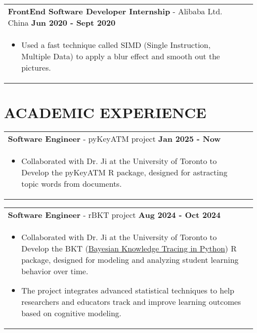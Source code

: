 \documentclass[a4paper,12pt]{article}
\begin{document}
\begin{tabularx}{\linewidth}{ @{}l r@{} }
\textbf{FrontEnd Software Developer Internship} - Alibaba Ltd. China \hfill \textbf{Jun 2020 - Sept 2020} \\[4pt]
\begin{minipage}[t]{\linewidth}
    \begin{itemize}[nosep,after=\strut, leftmargin=1em, itemsep=2pt]
        \item Used a fast technique called SIMD (Single Instruction, Multiple Data) to apply a blur effect and smooth out the pictures.
    \end{itemize}
\end{minipage}
\end{tabularx}

\hfill
\section{\textbf{ACADEMIC EXPERIENCE}}

\begin{tabularx}{\linewidth}{ @{}l r@{} }
    \textbf{Software Engineer} - pyKeyATM project \hfill \textbf{Jan 2025 - Now} \\[4pt]
    \begin{minipage}[t]{\linewidth}
        \begin{itemize}[nosep,after=\strut, leftmargin=1em, itemsep=2pt]
            \item Collaborated with Dr. Ji at the University of Toronto to Develop the pyKeyATM R package, designed for astracting topic words from documents.
        \end{itemize}
    \end{minipage}
    \end{tabularx}

\begin{tabularx}{\linewidth}{ @{}l r@{} }
    \textbf{Software Engineer} - rBKT project \hfill \textbf{Aug 2024 - Oct 2024} \\[4pt]
    \begin{minipage}[t]{\linewidth}
        \begin{itemize}[nosep,after=\strut, leftmargin=1em, itemsep=2pt]
            \item Collaborated with Dr. Ji at the University of Toronto to Develop the BKT (\href{https://github.com/CAHLR/pyBKT}{Bayesian Knowledge Tracing in Python}) R package, designed for modeling and analyzing student learning behavior over time.
            \item The project integrates advanced statistical techniques to help researchers and educators track and improve learning outcomes based on cognitive modeling.
        \end{itemize}
    \end{minipage}
    \end{tabularx}
\end{document}
